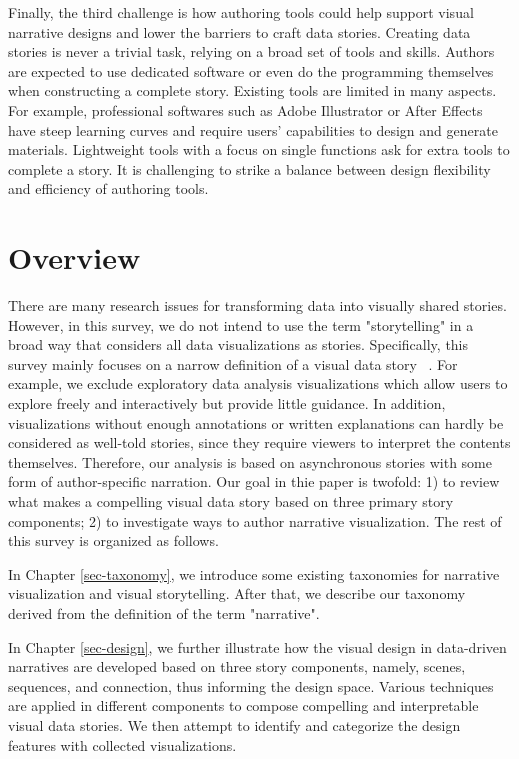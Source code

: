 Finally, the third challenge is how authoring tools could help support visual narrative designs and lower the barriers to craft data stories. Creating data stories is never a trivial task, relying on a broad set of tools and skills. Authors are expected to use dedicated software or even do the programming themselves when constructing a complete story. Existing tools are limited in many aspects. For example, professional softwares such as Adobe Illustrator or After Effects have steep learning curves and require users' capabilities to design and generate materials. Lightweight tools with a focus on single functions ask for extra tools to complete a story. It is challenging to strike a balance between design flexibility and efficiency of authoring tools. 


\section{Overview}
There are many research issues for transforming data into visually shared stories. However, in this survey, we do not intend to use the term "storytelling" in a broad way that considers all data visualizations as stories. Specifically, this survey mainly focuses on a narrow definition of a visual data story ~\cite{Lee2015}. For example, we exclude exploratory data analysis visualizations which allow users to explore freely and interactively but provide little guidance. In addition, visualizations without enough annotations or written explanations can hardly be considered as well-told stories, since they require viewers to interpret the contents themselves.  Therefore, our analysis is based on asynchronous stories with some form of author-specific narration. Our goal in thie paper is twofold: 1) to review what makes a compelling visual data story based on three primary story components; 2) to investigate ways to author narrative visualization. The rest of this survey is organized as follows.


In Chapter \ref{sec-taxonomy}, we introduce some existing taxonomies for narrative visualization and visual storytelling. After that, we describe our taxonomy derived from the definition of the term "narrative". 


In Chapter \ref{sec-design}, we further illustrate how the visual design in data-driven narratives are developed based on three story components, namely, scenes, sequences, and connection, thus informing the design space. Various techniques are applied in different components to compose compelling and interpretable visual data stories. We then attempt to identify and categorize the design features with collected visualizations.


